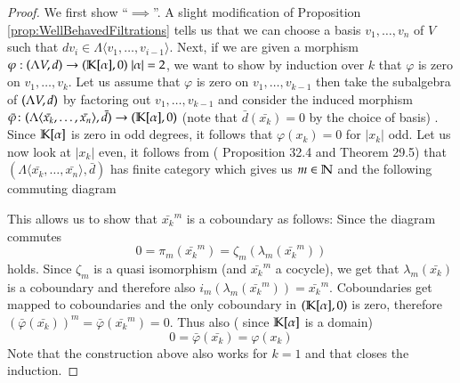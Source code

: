  \begin{proof}
 
  
  We first show ``$\implies$''. A slight modification of Proposition \ref{prop:WellBehavedFiltrations} tells us that we can 
  choose a basis $v_1, \ldots , v_n$ of $V$ such that $d v_i \in \Lambda \langle v_1, \ldots, v_{i-1} \rangle$.
  Next, if we are given a morphism  $ \varphi : (\Lambda V,d) \to (\mathbb{K}[\alpha],0) \; |\alpha| = 2 $, we want to show by induction over $k$ that
  $\varphi$ is zero on $v_1 , \ldots, v_k$. Let us assume that $\varphi$ is zero on $v_1, \ldots, v_{k-1}$ then take the
  subalgebra of $(\Lambda V,d)$ by factoring out $v_1, \ldots, v_{k-1}$ and consider the induced morphism 
  $\bar{\varphi} \colon (\Lambda \langle \bar{x_k}, \ldots, \bar{x_n} \rangle , \bar{d}) \to (\mathbb{K}[\alpha],0) $
  (note that $\bar{d}(\bar{x_k}) = 0$ by the  choice of basis) . Since $\mathbb{K}[\alpha]$ is zero in odd degrees,
  it follows that $\varphi(x_k) = 0$ for $|x_k|$ odd. Let us now look at $|x_k|$ even,
  it follows from \cite{Felix2001} ( Proposition 32.4 and Theorem 29.5) that 
  $(\Lambda \langle \bar{x_k}, \ldots, \bar{x_n} \rangle , \bar{d})$ has finite category which gives us  $m \in \mathbb{N}$ and the
  following commuting diagram
  
  \centerline {
  }
  This allows us to show that $\bar{x_k}^m$ is a coboundary as follows:
  Since the diagram commutes 
  $$0 = \pi_m(\bar{x_k}^m) =   \zeta_m (\lambda_m (\bar{x_k}^m))$$ 
  holds. Since $\zeta_m$ is a quasi isomorphism (and $\bar{x_k}^m$ a cocycle), we get that $\lambda_m (\bar{x_k})$ is a coboundary and
  therefore also $ i_m (\lambda_m (\bar{x_k}^m)) = \bar{x_k}^m$. Coboundaries get mapped to coboundaries and the only coboundary
  in $(\mathbb{K}[\alpha], 0)$ is zero, therefore 
  $(\bar{\varphi}(\bar{x_k}))^m = \bar{\varphi}(\bar{x_k}^m) = 0$. Thus also ( since $\mathbb{K}[\alpha]$ is a domain)
  $$ 0 = \bar{\varphi}(\bar{x_k}) = \varphi( x_k)$$
  Note that the construction above also works for $k = 1$ and that closes the induction.
%    
 \end{proof}

